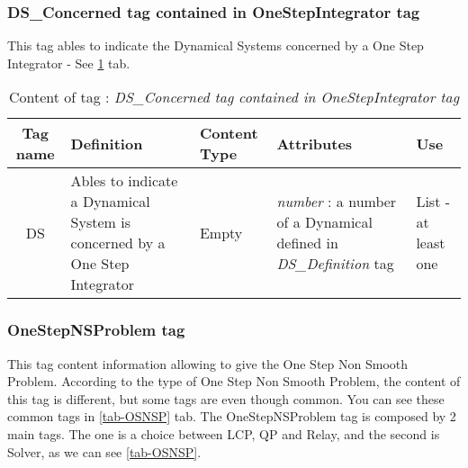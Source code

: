 \subsubsection{DS\_Concerned tag contained in OneStepIntegrator tag}
\label{OSIDSConTag}

This tag ables to indicate the Dynamical Systems concerned by a One Step Integrator - See \ref{tab-OSIDSConcerned} tab.\\


\begin{table}[!hbp]
\begin{center}
\begin{tabular}{|c|p{4cm}|p{2cm}|p{5cm}|p{2cm}|}
\hline
\bf{Tag name} & \bf{Definition} & \bf{Content Type} & \bf{Attributes} & \bf{Use}
\\\hline
\hline
DS  & Ables to indicate a Dynamical System is concerned by a One Step Integrator & Empty & \textit{number} : a number of a Dynamical defined in \textit{DS\_Definition} tag &  List - at least one \\
\hline
\end{tabular}
\end{center}
\caption{Content of tag : \textit{DS\_Concerned tag contained in OneStepIntegrator tag}}
\label{tab-OSIDSConcerned}
\end{table}




\subsubsection{OneStepNSProblem tag}
\label{OSNSProbTag}

This tag content information allowing to give the One Step Non Smooth Problem. According to the type of One Step Non Smooth Problem, the content of this tag is different, but some tags are even though common. You can see these common tags in \ref{tab-OSNSP} tab.
The OneStepNSProblem tag is composed by 2 main tags. The one is a choice between LCP, QP and Relay, and the second is Solver, as we can see \ref{tab-OSNSP}.


